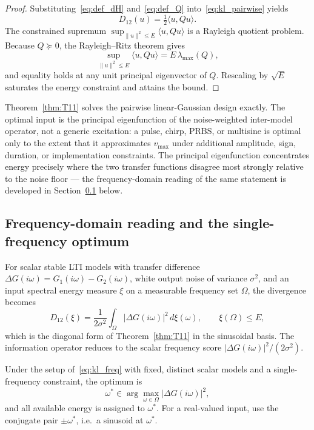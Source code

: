 \begin{proof}
Substituting~\eqref{eq:def_dH} and~\eqref{eq:def_Q} into~\eqref{eq:kl_pairwise} yields
\[
D_{12}(u) = \tfrac{1}{2} \langle u, Q u \rangle.
\]
The constrained supremum \(\sup_{\|u\|^2 \le E} \langle u, Q u\rangle\) is a Rayleigh quotient problem. Because \(Q \succeq 0\), the Rayleigh--Ritz theorem gives
\[
\sup_{\|u\|^2 \le E} \langle u, Q u\rangle = E\,\lambda_{\max}(Q),
\]
and equality holds at any unit principal eigenvector of \(Q\). Rescaling by \(\sqrt{E}\) saturates the energy constraint and attains the bound.
\end{proof}

\begin{remark}
Theorem~\ref{thm:T11} solves the pairwise linear-Gaussian design exactly. The optimal input is the principal eigenfunction of the noise-weighted inter-model operator, not a generic excitation: a pulse, chirp, PRBS, or multisine is optimal only to the extent that it approximates \(v_{\max}\) under additional amplitude, sign, duration, or implementation constraints. The principal eigenfunction concentrates energy precisely where the two transfer functions disagree most strongly relative to the noise floor --- the frequency-domain reading of the same statement is developed in Section~\ref{sec:freq_design} below.
\end{remark}

\subsection{Frequency-domain reading and the single-frequency optimum}
\label{sec:freq_design}

For scalar stable LTI models with transfer difference \(\Delta G(i\omega) = G_1(i\omega) - G_2(i\omega)\), white output noise of variance \(\sigma^2\), and an input spectral energy measure \(\xi\) on a measurable frequency set \(\Omega\), the divergence becomes
\begin{equation}
D_{12}(\xi) = \frac{1}{2\sigma^2} \int_{\Omega} |\Delta G(i\omega)|^2\, d\xi(\omega),
\qquad \xi(\Omega) \le E,
\label{eq:kl_freq}
\end{equation}
which is the diagonal form of Theorem~\ref{thm:T11} in the sinusoidal basis. The information operator reduces to the scalar frequency score \(|\Delta G(i\omega)|^2 / (2\sigma^2)\).

\begin{corollary}
\label{cor:single_freq}
Under the setup of~\eqref{eq:kl_freq} with fixed, distinct scalar models and a single-frequency constraint, the optimum is
\[
\omega^{*} \in \arg\max_{\omega \in \Omega} |\Delta G(i\omega)|^2,
\]
and all available energy is assigned to \(\omega^{*}\). For a real-valued input, use the conjugate pair \(\pm\omega^{*}\), i.e.\ a sinusoid at \(\omega^{*}\).
\end{corollary}

